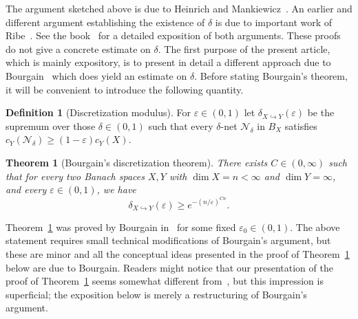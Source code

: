 \documentclass[12pt,reqno]{amsart}
\theoremstyle{plain}
\newtheorem{theorem}{Theorem}[section]
\theoremstyle{definition}
\newtheorem{definition}{Definition}[section]
\newcommand{\e}{\varepsilon}
\renewcommand{\d}{\delta}
\renewcommand{\ge}{\geqslant}
\begin{document}
The argument sketched above is due to Heinrich and Mankiewicz~\cite{HM82}. An earlier and different argument establishing the existence of $\d$ is due to important work of Ribe~\cite{Ribe76}.  See the book~\cite{BL00} for a detailed exposition of both arguments. These proofs do not give a concrete estimate on $\d$. The first purpose of the present article, which is mainly expository, is to present in detail a different approach due to Bourgain~\cite{Bou87} which does yield an estimate on $\delta$. Before stating Bourgain's theorem, it will be convenient to introduce the following quantity.


\begin{definition}[Discretization modulus] For $\e\in (0,1)$ let $\d_{X\hookrightarrow Y}(\e)$ be the supremum over those $\d\in (0,1)$ such that every $\d$-net $\mathcal N_\d$ in $B_X$ satisfies $c_Y(\mathcal{N}_\d)\ge (1-\e) c_Y(X)$.
\end{definition}

\begin{theorem}[Bourgain's discretization theorem]\label{thm:bourgain intro} There exists $C\in (0,\infty)$ such that for every two Banach spaces $X,Y$ with $\dim X=n<\infty$ and $\dim Y=\infty$, and every $\e\in (0,1)$, we have
\begin{equation}\label{eq:bourgain bound}
\d_{X\hookrightarrow Y}(\e)\ge e^{-(n/\e)^{Cn}}.
\end{equation}
\end{theorem}

Theorem~\ref{thm:bourgain intro} was proved by Bourgain in~\cite{Bou87} for some fixed $\e_0\in (0,1)$. The above statement requires small technical modifications of Bourgain's argument, but these are minor and all the conceptual ideas presented in the proof of Theorem~\ref{thm:bourgain intro} below are due to Bourgain.  Readers might notice that our presentation of the proof of Theorem~\ref{thm:bourgain intro} seems somewhat different from~\cite{Bou87}, but this impression is superficial; the exposition below is merely a restructuring of Bourgain's argument.
\end{document}

